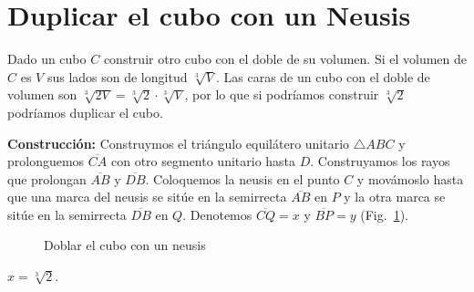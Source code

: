 \section{Duplicar el cubo con un Neusis}\label{s.neusis-doubling}

Dado un cubo $C$ construir otro cubo con el doble de su volumen. Si el volumen de $C$ es $V$ sus lados son de longitud $\sqrt[3]{V}$. Las caras de un cubo con el doble de volumen son $\sqrt[3]{2 V}=\sqrt[3]{2}\cdot\sqrt[3]{V}$, por lo que si podríamos construir $\sqrt[3]{2}$ podríamos duplicar el cubo.

\noindent\textbf{Construcción:}
Construymos el triángulo equilátero unitario $\triangle ABC$ y prolonguemos $\overline{CA}$ con otro segmento unitario hasta $D$. Construyamos los rayos que prolongan $\overline{AB}$ y $\overline{DB}$. Coloquemos la neusis en el punto $C$ y movámoslo hasta que una marca del neusis se sitúe en la semirrecta $\overline{AB}$ en $P$ y la otra marca se sitúe en la semirrecta $\overline{DB}$ en $Q$. Denotemos $\overline{CQ}=x$ y $\overline{BP}=y$ (Fig.~\ref{f.double-neusis}).

\begin{figure}[b]
\begin{center}
\end{center}
\caption{Doblar el cubo con un neusis}\label{f.double-neusis}
\end{figure}

\begin{theorem}
$x=\sqrt[3]{2}$.
\end{theorem}

